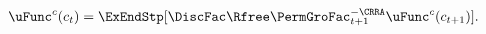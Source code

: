   \begin{equation}\begin{gathered}\begin{aligned}
        \uFunc^{c}(c_{t})  & = \ExEndStp[\DiscFac\Rfree \PermGroFac_{t+1}^{-\CRRA}\uFunc^{c}(c_{t+1})]. \label{eq:cEuler}
                                  \end{aligned}\end{gathered}\end{equation}
